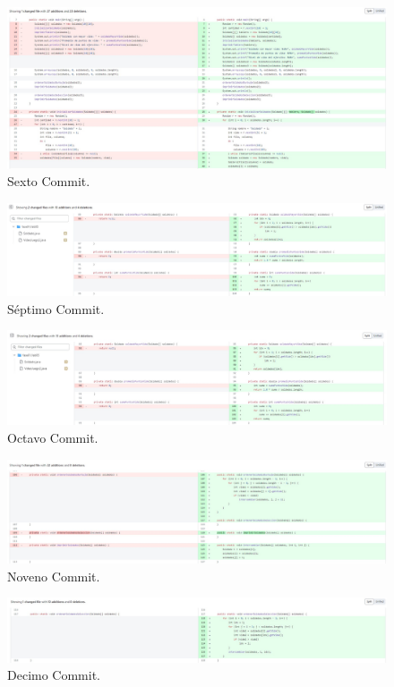 \documentclass{article}
\begin{document}
\begin{figure}[H]
	\centering
	\includegraphics[width=1\textwidth,keepaspectratio]{img/commit06.jpg}
	\caption{Sexto Commit.}
\end{figure}
\begin{figure}[H]
	\centering
	\includegraphics[width=1\textwidth,keepaspectratio]{img/commit07.jpg}
	\caption{Séptimo Commit.}
\end{figure}
\begin{figure}[H]
	\centering
	\includegraphics[width=1\textwidth,keepaspectratio]{img/commit08.jpg}
	\caption{Octavo Commit.}
\end{figure}
\begin{figure}[H]
	\centering
	\includegraphics[width=1\textwidth,keepaspectratio]{img/commit09.jpg}
	\caption{Noveno Commit.}
\end{figure}
\begin{figure}[H]
	\centering
	\includegraphics[width=1\textwidth,keepaspectratio]{img/commit10.jpg}
	\caption{Decimo Commit.}
\end{figure}
\pagebreak
\end{document}
